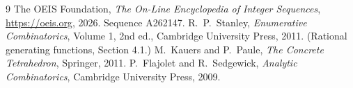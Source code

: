 \documentclass[11pt,a4paper]{article}
\theoremstyle{plain}
\theoremstyle{definition}
\begin{document}
\begin{thebibliography}{9}
 The OEIS Foundation, \emph{The On-Line Encyclopedia of Integer
Sequences}, \url{https://oeis.org}, 2026. Sequence A262147.
 R.~P.~Stanley, \emph{Enumerative Combinatorics}, Volume 1, 2nd ed.,
Cambridge University Press, 2011. (Rational generating functions, Section 4.1.)
 M.~Kauers and P.~Paule, \emph{The Concrete Tetrahedron}, Springer, 2011.
 P.~Flajolet and R.~Sedgewick, \emph{Analytic Combinatorics}, Cambridge
University Press, 2009.
\end{thebibliography}
\end{document}
